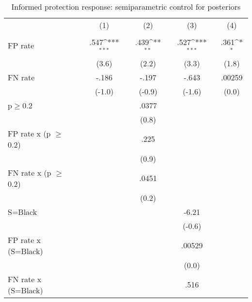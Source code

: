 \begin{table}[htbp]\centering
\def\sym#1{\ifmmode^{#1}\else\(^{#1}\)\fi}
\caption{Informed protection response: semiparametric control for posteriors}
\begin{tabular}{l*{4}{c}}
\hline\hline
                &\multicolumn{1}{c}{(1)}&\multicolumn{1}{c}{(2)}&\multicolumn{1}{c}{(3)}&\multicolumn{1}{c}{(4)}\\
                &\multicolumn{1}{c}{}&\multicolumn{1}{c}{}&\multicolumn{1}{c}{}&\multicolumn{1}{c}{}\\
\hline
FP rate         &     .547\sym{***}&     .439\sym{**} &     .527\sym{***}&     .361\sym{*}  \\
                &    (3.6)         &    (2.2)         &    (3.3)         &    (1.8)         \\
FN rate         &    -.186         &    -.197         &    -.643         &   .00259         \\
                &   (-1.0)         &   (-0.9)         &   (-1.6)         &    (0.0)         \\
p$\geq$0.2      &                  &    .0377         &                  &                  \\
                &                  &    (0.8)         &                  &                  \\
FP rate x (p $\geq$ 0.2)&                  &     .225         &                  &                  \\
                &                  &    (0.9)         &                  &                  \\
FN rate x (p $\geq$ 0.2)&                  &    .0451         &                  &                  \\
                &                  &    (0.2)         &                  &                  \\
S=Black         &                  &                  &    -6.21         &                  \\
                &                  &                  &   (-0.6)         &                  \\
FP rate x (S=Black)&                  &                  &   .00529         &                  \\
                &                  &                  &    (0.0)         &                  \\
FN rate x (S=Black)&                  &                  &     .516         &                  \\

\end{tabular}
\end{table}
